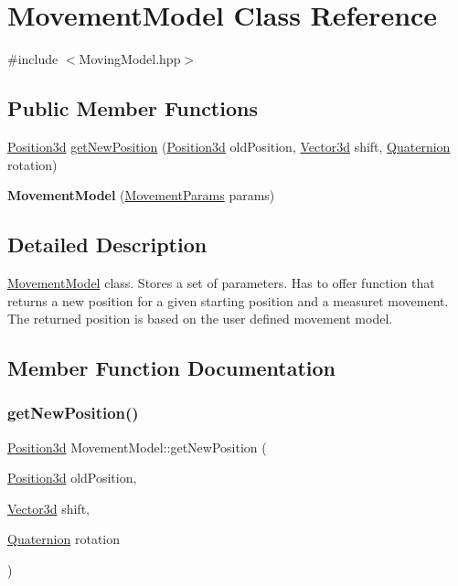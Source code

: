 \hypertarget{classMovementModel}{}\section{Movement\+Model Class Reference}
\label{classMovementModel}


{\ttfamily \#include $<$Moving\+Model.\+hpp$>$}

\subsection*{Public Member Functions}
\begin{DoxyCompactItemize}
\item 
\hyperlink{classPosition3d}{Position3d} \hyperlink{classMovementModel_a438ac9158e809bfc0b27645c3fefd573}{get\+New\+Position} (\hyperlink{classPosition3d}{Position3d} old\+Position, \hyperlink{structVector3d}{Vector3d} shift, \hyperlink{structQuaternion}{Quaternion} rotation)
\item 
\mbox{\label{classMovementModel_a44d47752a9bef345b3e6c1b1c56055e1}} 
{\bfseries Movement\+Model} (\hyperlink{structMovementParams}{Movement\+Params} params)
\end{DoxyCompactItemize}


\subsection{Detailed Description}
\hyperlink{classMovementModel}{Movement\+Model} class. Stores a set of parameters. Has to offer function that returns a new position for a given starting position and a measuret movement. The returned position is based on the user defined movement model. 

\subsection{Member Function Documentation}
\mbox{\label{classMovementModel_a438ac9158e809bfc0b27645c3fefd573}} 
\subsubsection{\texorpdfstring{get\+New\+Position()}{getNewPosition()}}
{\footnotesize\ttfamily \hyperlink{classPosition3d}{Position3d} Movement\+Model\+::get\+New\+Position (\begin{DoxyParamCaption}\item[{\hyperlink{classPosition3d}{Position3d}}]{old\+Position,  }\item[{\hyperlink{structVector3d}{Vector3d}}]{shift,  }\item[{\hyperlink{structQuaternion}{Quaternion}}]{rotation }\end{DoxyParamCaption})}



